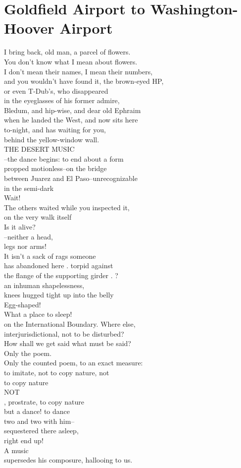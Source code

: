 \documentclass[smalldemyvopaper,11pt,twoside,onecolumn,openright,extrafontsizes]{memoir}
\begin{document}
\chapter{Goldfield Airport to Washington-Hoover Airport}
I bring back, old man, a parcel of flowers.
\\You don't know what I mean about flowers.
\\I don't mean their names, I mean their numbers,
\\and you wouldn't have found it, the brown-eyed HP,
\\or even T-Dub's, who disappeared
\\in the eyeglasses of his former admire,
\\Bledum, and hip-wise, and dear old Ephraim
\\when he landed the West, and now sits here
\\to-night, and has waiting for you,
\\behind the yellow-window wall.
\\THE DESERT MUSIC
\\--the dance begins: to end about a form
\\propped motionless--on the bridge
\\between Juarez and El Paso--unrecognizable
\\in the semi-dark
\\Wait!
\\The others waited while you inspected it,
\\on the very walk itself
\\Is it alive?
\\--neither a head,
\\legs nor arms!
\\It isn't a sack of rags someone
\\has abandoned here        .        torpid against
\\the flange of the supporting girder        .        ?
\\an inhuman shapelessness,
\\knees hugged tight up into the belly
\\Egg-shaped!
\\What a place to sleep!
\\on the International Boundary.     Where else,
\\interjurisdictional, not to be disturbed?
\\How shall we get said what must be said?
\\Only the poem.
\\Only the counted poem, to an exact measure:
\\to imitate, not to copy nature, not
\\to copy nature
\\NOT
\\, prostrate, to copy nature
\\but a dance! to dance
\\two and two with him--
\\sequestered there asleep,
\\right end up!
\\A music
\\supersedes his composure, hallooing to us.
\end{document}
